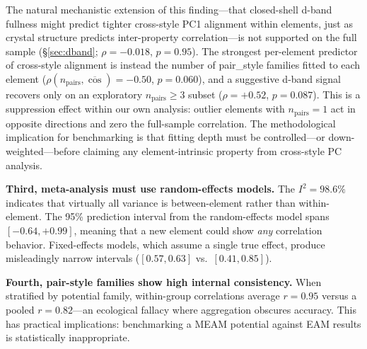 \documentclass[twocolumn,9pt]{extarticle}
\begin{document}
The natural mechanistic extension of this finding---that closed-shell d-band fullness might predict tighter cross-style PC1 alignment within elements, just as crystal structure predicts inter-property correlation---is not supported on the full sample (\S\ref{sec:dband}; $\rho = -0.018$, $p = 0.95$). The strongest per-element predictor of cross-style alignment is instead the number of pair\_style families fitted to each element ($\rho(n_{\text{pairs}}, \overline{\cos}) = -0.50$, $p = 0.060$), and a suggestive d-band signal recovers only on an exploratory $n_{\text{pairs}} \geq 3$ subset ($\rho = +0.52$, $p = 0.087$). This is a suppression effect within our own analysis: outlier elements with $n_{\text{pairs}} = 1$ act in opposite directions and zero the full-sample correlation. The methodological implication for benchmarking is that fitting depth must be controlled---or down-weighted---before claiming any element-intrinsic property from cross-style PC analysis.

\textbf{Third, meta-analysis must use random-effects models.} The $I^2 = 98.6\%$ indicates that virtually all variance is between-element rather than within-element. The 95\% prediction interval from the random-effects model spans $[-0.64, +0.99]$, meaning that a new element could show \textit{any} correlation behavior. Fixed-effects models, which assume a single true effect, produce misleadingly narrow intervals ($[0.57, 0.63]$ vs.\ $[0.41, 0.85]$).

\textbf{Fourth, pair-style families show high internal consistency.} When stratified by potential family, within-group correlations average $r = 0.95$ versus a pooled $r = 0.82$---an ecological fallacy where aggregation obscures accuracy. This has practical implications: benchmarking a MEAM potential against EAM results is statistically inappropriate.
\end{document}
